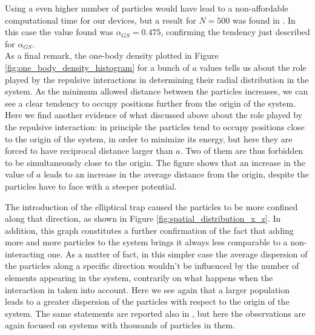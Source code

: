 Using a even higher number of particles would have lead to a non-affordable computational time for our devices, but a result for $N=500$ was found in \cite{Nilsen2005}. In this case the value found was $\alpha_{GS}=0.475$, confirming the tendency just described for $\alpha_{GS}$.  \\

As a final remark, the one-body density plotted in Figure \ref{fig:one_body_density_histogram} for a bunch of $a$ values tells us about the role played by the repulsive interactions in determining their radial distribution in the system. As the minimum allowed distance between the particles increases, we can see a clear tendency to occupy positions further from the origin of the system. Here we find another evidence of what discussed above about the role played by the repulsive interaction: in principle the particles tend to occupy positions close to the origin of the system, in order to minimize its energy, but here they are forced to have reciprocal distance larger than $a$. Two of them are thus forbidden to be simultaneously close to the origin. The figure shows that an increase in the value of $a$ leads to an increase in the average distance from the origin, despite the particles have to face with a steeper potential.

The introduction of the elliptical trap caused the particles to be more confined along that direction, as shown in Figure \ref{fig:spatial_distribution_x_z}. In addition, this graph constitutes a further confirmation of the fact that adding more and more particles to the system brings it always less comparable to a non-interacting one. As a matter of fact, in this simpler case the average dispersion of the particles along a specific direction wouldn't be influenced by the number of elements appearing in the system, contrarily on what happens when the interaction in taken into account. Here we see again that a larger population leads to a greater dispersion of the particles with respect to the origin of the system. The same statements are reported also in \cite{duBois}, but here the observations are again focused on systems with thousands of particles in them. 






